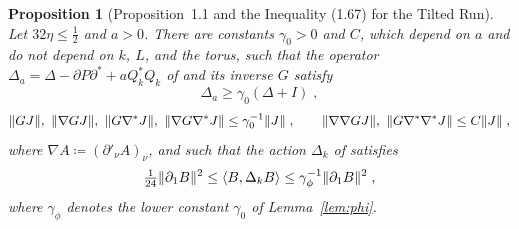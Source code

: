 \documentclass[11pt]{preprint}
\DeclarePairedDelimiter{\norm}{\lVert}{\rVert}
\numberwithin{equation}{section}
\newtheorem{proposition}[theorem]{Proposition}
\theoremstyle{definition}
\theoremstyle{remark}
\theoremstyle{plain}
\begin{document}
\begin{proposition}[Proposition~1.1 and the Inequality (1.67) for the Tilted Run]\label{prop:l2-bounds}
Let $32\eta \leq \frac12$ and $a > 0$. There are constants $\gamma_0 > 0$ and $C$, which depend on $a$ and do not depend on $k$, $L$, and the torus, such that the operator $\Delta_a = \Delta - \partial P\partial^* + aQ_k^*Q_k$ of \cite[(1.69)]{BalabanPRT1} and its inverse $G$ satisfy
\begin{equation}\label{eq:l2-lower}
    \Delta_a \geq \gamma_0(\Delta + I)\;,
\end{equation}
\begin{equation}\label{eq:l2-bounds}
    \norm{GJ},\ \norm{\nabla GJ},\ \norm{G\nabla^*J},\ \norm{\nabla G\nabla^*J} \leq \gamma_0^{-1}\norm{J}\;,
    \qquad
    \norm{\nabla\nabla GJ},\ \norm{G\nabla^*\nabla^*J} \leq C\norm{J}\;,
\end{equation}
where $\nabla A \coloneqq (\partial'_\nu A)_\nu$, and such that the action $\Delta_k$ of \cite[(1.65)]{BalabanPRT1} satisfies
\begin{equation}\label{eq:action-bounds}
    \tfrac{1}{24}\norm{\partial_1B}^2 \leq \langle B, \Delta_kB\rangle \leq \gamma_\phi^{-1}\norm{\partial_1B}^2\;,
\end{equation}
where $\gamma_\phi$ denotes the lower constant $\gamma_0$ of Lemma~\ref{lem:phi}.
\end{proposition}
\end{document}
